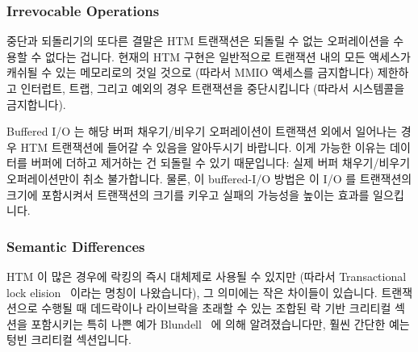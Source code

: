 \fi

\subsubsection{Irrevocable Operations}
\label{sec:future:Irrevocable Operations}

중단과 되돌리기의 또다른 결말은 HTM 트랜잭션은 되돌릴 수 없는 오퍼레이션을
수용할 수 없다는 겁니다.
현재의 HTM 구현은 일반적으로 트랜잭션 내의 모든 액세스가 캐쉬될 수 있는
메모리로의 것일 것으로 (따라서 MMIO 액세스를 금지합니다) 제한하고 인터럽트,
트랩, 그리고 예외의 경우 트랜잭션을 중단시킵니다 (따라서 시스템콜을
금지합니다).

Buffered I/O 는 해당 버퍼 채우기/비우기 오퍼레이션이 트랜잭션 외에서 일어나는
경우 HTM 트랜잭션에 들어갈 수 있음을 알아두시기 바랍니다.
이게 가능한 이유는 데이터를 버퍼에 더하고 제거하는 건 되돌릴 수 있기
때문입니다: 실제 버퍼 채우기/비우기 오퍼레이션만이 취소 불가합니다.
물론, 이 buffered-I/O 방법은 이 I/O 를 트랜잭션의 크기에 포함시켜서 트랜잭션의
크기를 키우고 실패의 가능성을 높이는 효과를 일으킵니다.

\iffalse

Another consequence of aborts and rollbacks is that HTM transactions
cannot accommodate irrevocable operations.
Current HTM implementations typically enforce this limitation by
requiring that all of the accesses in the transaction be to cacheable
memory (thus prohibiting MMIO accesses) and aborting transactions on
interrupts, traps, and exceptions (thus prohibiting system calls).

Note that buffered I/O can be accommodated by HTM transactions as
long as the buffer fill/flush operations occur extra-transactionally.
The reason that this works is that adding data to and removing data
from the buffer is revocable: Only the actual buffer fill/flush
operations are irrevocable.
Of course, this buffered-I/O approach has the effect of including the I/O
in the transaction's footprint, increasing the size of the transaction
and thus increasing the probability of failure.

\fi

\subsubsection{Semantic Differences}
\label{sec:future:Semantic Differences}

HTM 이 많은 경우에 락킹의 즉시 대체제로 사용될 수 있지만 (따라서 Transactional
lock elision~\cite{DaveDice2008TransactLockElision} 이라는 명칭이 나왔습니다),
그 의미에는 작은 차이들이 있습니다.
트랜잭션으로 수행될 때 데드락이나 라이브락을 초래할 수 있는 조합된 락 기반
크리티컬 섹션을 포함시키는 특히 나쁜 예가
Blundell~\cite{Blundell2006TMdeadlock} 에 의해 알려졌습니다만, 훨씬 간단한 예는
텅빈 크리티컬 섹션입니다.

